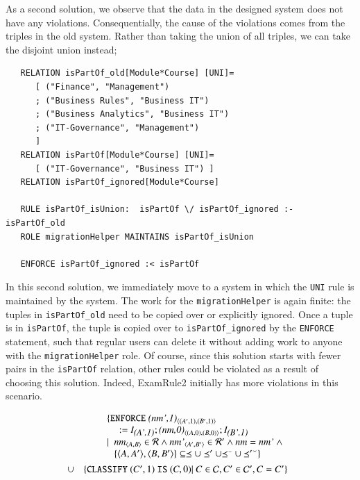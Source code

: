 \documentclass{elsarticle}
\begin{document}
As a second solution, we observe that the data in the designed system does not have any violations.
Consequentially, the cause of the violations comes from the triples in the old system.
Rather than taking the union of all triples, we can take the disjoint union instead;
\begin{verbatim}
   RELATION isPartOf_old[Module*Course] [UNI]=
      [ ("Finance", "Management")
      ; ("Business Rules", "Business IT")
      ; ("Business Analytics", "Business IT")
      ; ("IT-Governance", "Management")
      ]
   RELATION isPartOf[Module*Course] [UNI]=
      [ ("IT-Governance", "Business IT") ]
   RELATION isPartOf_ignored[Module*Course]
   
   RULE isPartOf_isUnion:  isPartOf \/ isPartOf_ignored :- isPartOf_old
   ROLE migrationHelper MAINTAINS isPartOf_isUnion
   
   ENFORCE isPartOf_ignored :< isPartOf
\end{verbatim}

In this second solution, we immediately move to a system in which the \verb=UNI= rule is maintained by the system.
The work for the \verb=migrationHelper= is again finite: the tuples in \verb=isPartOf_old= need to be copied over or explicitly ignored.
Once a tuple is in \verb=isPartOf=, the tuple is copied over to \verb=isPartOf_ignored= by the \verb=ENFORCE= statement, such that regular users can delete it without adding work to anyone with the \verb=migrationHelper= role.
Of course, since this solution starts with fewer pairs in the \verb=isPartOf= relation, other rules could be violated as a result of choosing this solution.
Indeed, ExamRule2 initially has more violations in this scenario.

\begin{definition}
   \begin{eqnarray}
      &&\begin{array}[t]{@{}l}
         \{ {\tt ENFORCE\ }\declare{(nm',1)}{(A',1)}{(B',1)}\\\quad{\tt\ :=\ }\ident{(A',1)};\declare{(nm,0)}{(A,0)}{(B,0)};\ident{(B',1)}\\
            \mid\ \begin{array}[t]{@{}l}
               \declare{nm}{A}{B}\in\rels\wedge\declare{nm'}{A'}{B'}\in\rels'\wedge\id{nm}=\id{nm'}\ \wedge\\
               \{\pair{A}{A'},\pair{B}{B'}\}\subseteq\isa\cup\isa'\cup\flip{\isa}\cup\flip{\isa'}\}
               \end{array}
           \end{array}\\
           &\cup&\begin{array}[t]{@{}l}
            \{ {\tt CLASSIFY\ }(C',1){\tt\ IS\ }(C,0)|\ C\in\concepts,C'\in\concepts',C=C'\}\\
           \end{array}
   \end{eqnarray}
\end{definition}
\end{document}
